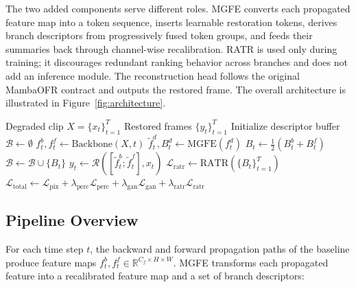 \documentclass[symmetry,article,submit,pdftex,moreauthors]{Definitions/mdpi}
\begin{document}
The two added components serve different roles. MGFE converts each propagated feature map into a token sequence, inserts learnable restoration tokens, derives branch descriptors from progressively fused token groups, and feeds their summaries back through channel-wise recalibration. RATR is used only during training; it discourages redundant ranking behavior across branches and does not add an inference module. The reconstruction head follows the original MambaOFR contract and outputs the restored frame. The overall architecture is illustrated in Figure~\ref{fig:architecture}.

\begin{algorithm}[H]
\caption{MgfrOFR forward pass for a clip of length $T$.\label{alg:mgfrofr}}
\begin{algorithmic}[1]
\Require Degraded clip $X=\{x_t\}_{t=1}^{T}$
\Ensure Restored frames $\{y_t\}_{t=1}^{T}$
\State Initialize descriptor buffer $\mathcal{B} \leftarrow \emptyset$
    \State $f_t^{b}, f_t^{f} \leftarrow \text{Backbone}(X, t)$ 
        \State $\widetilde{f}_t^{d}, B_t^{d} \leftarrow \text{MGFE}(f_t^{d})$ 
    \EndFor
    \State $B_t \leftarrow \frac{1}{2}(B_t^{b} + B_t^{f})$ 
    \State $\mathcal{B} \leftarrow \mathcal{B} \cup \{B_t\}$ 
    \State $y_t \leftarrow \mathcal{R}([\widetilde{f}_t^{b}; \widetilde{f}_t^{f}], x_t)$ 
\EndFor
{}
    \State $\mathcal{L}_{\text{ratr}} \leftarrow \text{RATR}(\{B_t\}_{t=1}^{T})$ 
    \State $\mathcal{L}_{\text{total}} \leftarrow \mathcal{L}_{\text{pix}} + \lambda_{\text{perc}}\mathcal{L}_{\text{perc}} + \lambda_{\text{gan}}\mathcal{L}_{\text{gan}} + \lambda_{\text{ratr}}\mathcal{L}_{\text{ratr}}$
\EndIf
\end{algorithmic}
\end{algorithm}

\subsection{Pipeline Overview}
\label{subsec:overview}

For each time step $t$, the backward and forward propagation paths of the baseline produce feature maps $f_t^{b}, f_t^{f} \in \mathbb{R}^{C_f \times H \times W}$. MGFE transforms each propagated feature into a recalibrated feature map and a set of branch descriptors:
\end{document}
